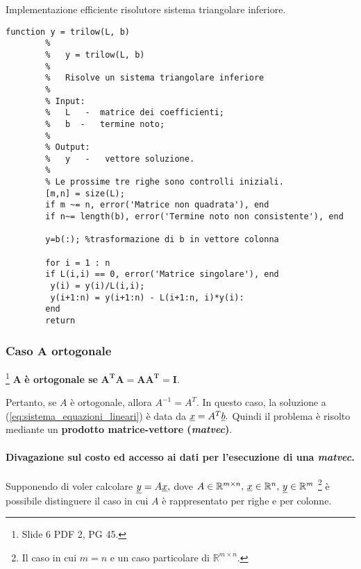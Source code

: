 \begin{algorithm}
	\caption{Implementazione efficiente risolutore sistema triangolare inferiore.}\label{alg:trilow}
	\begin{lstlisting}[style=Matlab-editor]
		function y = trilow(L, b)
		%   
		%   y = trilow(L, b)
		%
		%   Risolve un sistema triangolare inferiore
		%
		% Input:
		%   L   -  matrice dei coefficienti;
		%   b  -   termine noto;
		%   
		% Output:
		%   y   -   vettore soluzione.
		%
		% Le prossime tre righe sono controlli iniziali.
		[m,n] = size(L);
		if m ~= n, error('Matrice non quadrata'), end
		if n~= length(b), error('Termine noto non consistente'), end
		
		y=b(:); %trasformazione di b in vettore colonna
		
		for i = 1 : n
		if L(i,i) == 0, error('Matrice singolare'), end
		 y(i) = y(i)/L(i,i);
		 y(i+1:n) = y(i+1:n) - L(i+1:n, i)*y(i):
		end
		return
	\end{lstlisting}
\end{algorithm}

\subsubsection{Caso \texorpdfstring{$\boldsymbol A$}{A} ortogonale}
\begin{definition}
    \footnote{Slide 6 PDF 2, PG 45.} $\boldsymbol A$ \textbf{è ortogonale se} $\boldsymbol{A^TA=AA^T=I.}$
\end{definition}
Pertanto, se $A$ è ortogonale, allora $A^{-1}=A^T.$ In questo caso, la soluzione a (\ref{eq:sistema_equazioni_lineari}) è data da $\uline x = A^T\uline b.$ Quindi il problema è risolto mediante un \textbf{prodotto matrice-vettore (\textit{matvec})}.

\paragraph{Divagazione sul costo ed accesso ai dati per l'esecuzione di una \textit{matvec}.} Supponendo di voler calcolare $\uline y= A \uline x,$ dove $A\in\mathbb R^{m\times n},\,\uline x\in\mathbb R^n,\, \uline y\in\mathbb R^m$ \footnote{Il caso in cui $m=n$ e un caso particolare di $\mathbb R^{m\times n}$.} è possibile distinguere il caso in cui $A$ è rappresentato per righe e per colonne.

